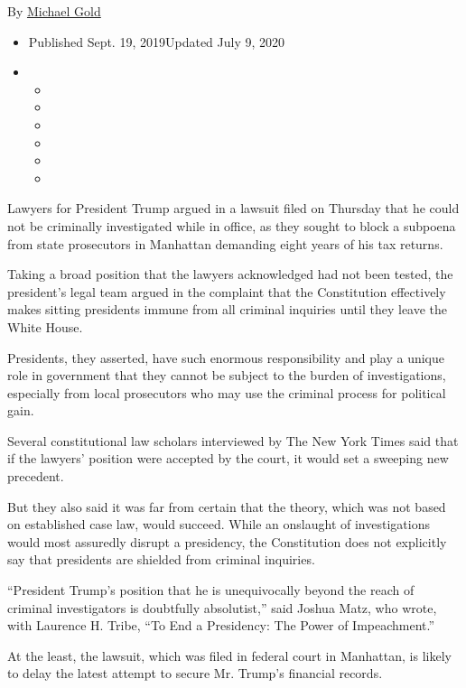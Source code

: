 By \href{https://www.nytimes3xbfgragh.onion/by/michael-gold}{Michael
Gold}

\begin{itemize}
\item
  Published Sept. 19, 2019Updated July 9, 2020
\item
  \begin{itemize}
  \item
  \item
  \item
  \item
  \item
  \item
  \end{itemize}
\end{itemize}

Lawyers for President Trump argued in a lawsuit filed on Thursday that
he could not be criminally investigated while in office, as they sought
to block a subpoena from state prosecutors in Manhattan demanding eight
years of his tax returns.

Taking a broad position that the lawyers acknowledged had not been
tested, the president's legal team argued in the complaint that the
Constitution effectively makes sitting presidents immune from all
criminal inquiries until they leave the White House.

Presidents, they asserted, have such enormous responsibility and play a
unique role in government that they cannot be subject to the burden of
investigations, especially from local prosecutors who may use the
criminal process for political gain.

Several constitutional law scholars interviewed by The New York Times
said that if the lawyers' position were accepted by the court, it would
set a sweeping new precedent.

But they also said it was far from certain that the theory, which was
not based on established case law, would succeed. While an onslaught of
investigations would most assuredly disrupt a presidency, the
Constitution does not explicitly say that presidents are shielded from
criminal inquiries.

``President Trump's position that he is unequivocally beyond the reach
of criminal investigators is doubtfully absolutist,'' said Joshua Matz,
who wrote, with Laurence H. Tribe, ``To End a Presidency: The Power of
Impeachment.''

At the least, the lawsuit, which was filed in federal court in
Manhattan, is likely to delay the latest attempt to secure Mr. Trump's
financial records.


